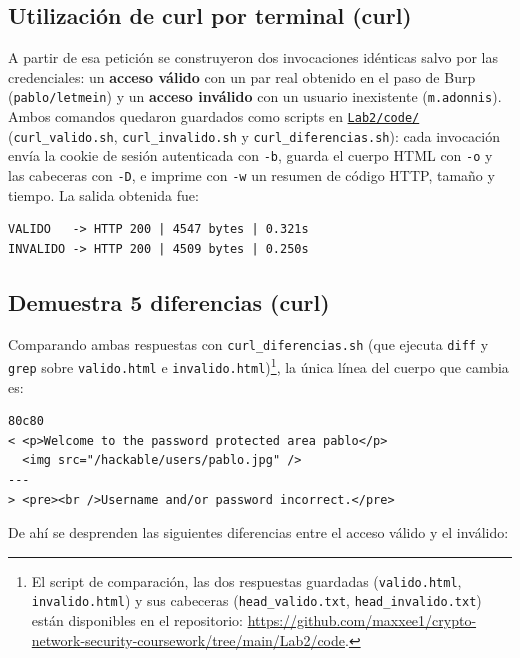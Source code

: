 \documentclass[letter,12pt]{article}
\begin{document}
\subsection{Utilización de curl por terminal (curl)}
A partir de esa petición se construyeron dos invocaciones idénticas salvo por las credenciales: un \textbf{acceso válido} con un par real obtenido en el paso de Burp (\texttt{pablo/letmein}) y un \textbf{acceso inválido} con un usuario inexistente (\texttt{m.adonnis}). Ambos comandos quedaron guardados como scripts en \href{https://github.com/maxxee1/crypto-network-security-coursework/tree/main/Lab2/code}{\texttt{Lab2/code/}} (\texttt{curl\_valido.sh}, \texttt{curl\_invalido.sh} y \texttt{curl\_diferencias.sh}): cada invocación envía la cookie de sesión autenticada con \texttt{-b}, guarda el cuerpo HTML con \texttt{-o} y las cabeceras con \texttt{-D}, e imprime con \texttt{-w} un resumen de código HTTP, tamaño y tiempo. La salida obtenida fue: \\


\begin{verbatim}
VALIDO   -> HTTP 200 | 4547 bytes | 0.321s
INVALIDO -> HTTP 200 | 4509 bytes | 0.250s
\end{verbatim}

\newpage
\subsection{Demuestra 5 diferencias (curl)}
Comparando ambas respuestas con \texttt{curl\_diferencias.sh} (que ejecuta \texttt{diff} y \texttt{grep} sobre \texttt{valido.html} e \texttt{invalido.html})\footnote{El script de comparación, las dos respuestas guardadas (\texttt{valido.html}, \texttt{invalido.html}) y sus cabeceras (\texttt{head\_valido.txt}, \texttt{head\_invalido.txt}) están disponibles en el repositorio: \url{https://github.com/maxxee1/crypto-network-security-coursework/tree/main/Lab2/code}.}, la única línea del cuerpo que cambia es:


\begin{verbatim}
80c80
< <p>Welcome to the password protected area pablo</p>
  <img src="/hackable/users/pablo.jpg" />
---
> <pre><br />Username and/or password incorrect.</pre>
\end{verbatim}

De ahí se desprenden las siguientes diferencias entre el acceso válido y el inválido:
\end{document}
